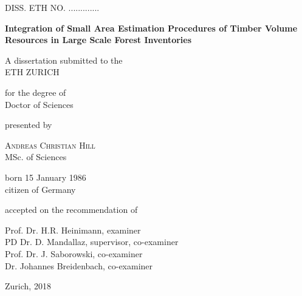 

\begin{titlepage}

\begin{center}

\textsc{DISS. ETH NO. .............}

\vspace*{2cm}
\Large
\textbf{Integration of Small Area Estimation Procedures of Timber Volume Resources in Large Scale Forest Inventories}

\vspace*{1cm}
A dissertation submitted to the \\
ETH ZURICH

\vspace*{1cm}
for the degree of \\
Doctor of Sciences

\vspace*{1cm}
presented by

\vspace*{0.5cm}
\textsc{Andreas Christian Hill} \\
MSc. of Sciences

\vspace*{0.5cm}
born 15 January 1986 \\
citizen of Germany

\vspace*{1cm}
accepted on the recommendation of

\vspace*{0.2cm}
Prof. Dr. H.R. Heinimann, examiner\\
PD Dr. D. Mandallaz, supervisor, co-examiner\\
Prof. Dr. J. Saborowski, co-examiner\\
Dr. Johannes Breidenbach, co-examiner

\vspace{3cm}
Zurich, 2018


\end{center}

\end{titlepage}